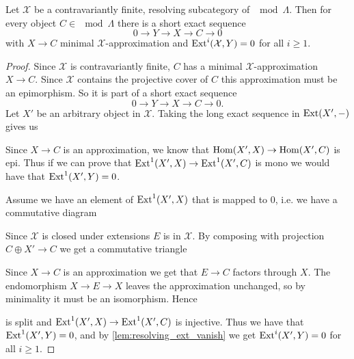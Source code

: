\begin{lemma} \label{lem:exact_sequence_from_approximation}
	Let $\mathcal X$ be a contravariantly finite, resolving subcategory of $\mod \Lambda$. Then for every object $C \in \mod\Lambda$ there is a short exact sequence 
	$$0 \to Y \to X \to C \to 0$$ 
	with $X\to C$ minimal $\mathcal X$-approximation and $\operatorname{Ext}^i(\mathcal X, Y)=0$ for all $i \geq 1$.
	\begin{proof}
		Since $\mathcal X$ is contravariantly finite, $C$ has a minimal $\mathcal X$-approximation $X \to C$. Since $\mathcal X$ contains the projective cover of $C$ this approximation must be an epimorphism. So it is part of a short exact sequence $$0 \to Y \to X \to C \to 0.$$ Let $X'$ be an arbitrary object in $\mathcal X$. Taking the long exact sequence in $\operatorname{Ext}(X', -)$ gives us
		\begin{center}
		\end{center}
		Since $X \to C$ is an approximation, we know that $\operatorname{Hom}(X', X) \to \operatorname{Hom}(X', C)$ is epi. Thus if we can prove that $\operatorname{Ext}^1(X', X) \to \operatorname{Ext}^1(X', C)$ is mono we would have that $\operatorname{Ext}^1(X', Y)=0$. 
		
		Assume we have an element of $\operatorname{Ext}^1(X', X)$ that is mapped to 0, i.e. we have a commutative diagram
		\begin{center}
		\end{center}
		Since $\mathcal X$ is closed under extensions $E$ is in $\mathcal X$. By composing with projection $C\oplus X' \to C$ we get a commutative triangle
		\begin{center}
		\end{center}
		Since $X \to C$ is an approximation we get that $E \to C$ factors through $X$. The endomorphism $X \to E \to X$ leaves the approximation unchanged, so by minimality it must be an isomorphism. Hence 
		\begin{center}
		\end{center}
		is split and $\operatorname{Ext}^1(X', X) \to \operatorname{Ext}^1(X', C)$ is injective. Thus we have that $\operatorname{Ext}^1(X', Y)=0$, and by \cref{lem:resolving_ext_vanish} we get $\operatorname{Ext}^i(X', Y)=0$ for all $i\geq 1$.
	\end{proof}
\end{lemma}

